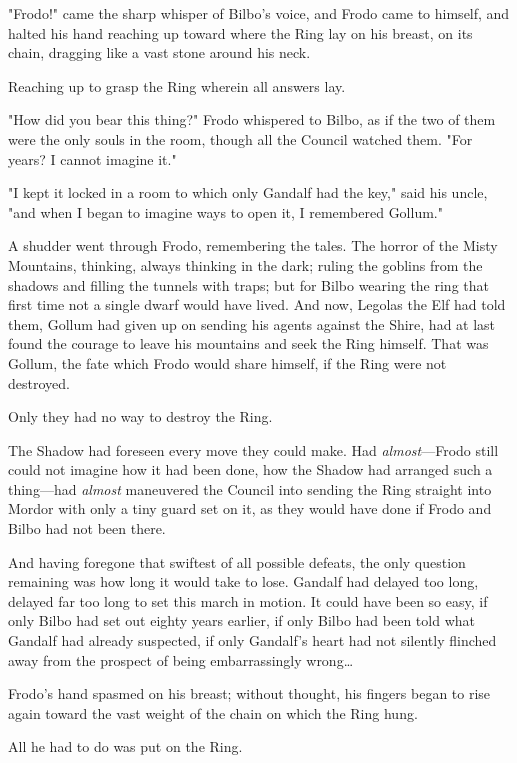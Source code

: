 "Frodo!" came the sharp whisper of Bilbo's voice, and Frodo came to himself, 
and halted his hand reaching up toward where the Ring lay on his breast, on its 
chain, dragging like a vast stone around his neck.

Reaching up to grasp the Ring wherein all answers lay.

"How did you bear this thing?" Frodo whispered to Bilbo, as if the two of them 
were the only souls in the room, though all the Council watched them. "For 
years? I cannot imagine it."

"I kept it locked in a room to which only Gandalf had the key," said his uncle, 
"and when I began to imagine ways to open it, I remembered Gollum."

A shudder went through Frodo, remembering the tales. The horror of the Misty 
Mountains, thinking, always thinking in the dark; ruling the goblins from the 
shadows and filling the tunnels with traps; but for Bilbo wearing the ring that 
first time not a single dwarf would have lived. And now, Legolas the Elf had 
told them, Gollum had given up on sending his agents against the Shire, had at 
last found the courage to leave his mountains and seek the Ring himself. That 
was Gollum, the fate which Frodo would share himself, if the Ring were not 
destroyed.

Only they had no way to destroy the Ring.

The Shadow had foreseen every move they could make. Had \emph{almost}---Frodo 
still could not imagine how it had been done, how the Shadow had arranged such 
a thing---had \emph{almost} maneuvered the Council into sending the Ring 
straight into Mordor with only a tiny guard set on it, as they would have done 
if Frodo and Bilbo had not been there.

And having foregone that swiftest of all possible defeats, the only question 
remaining was how long it would take to lose. Gandalf had delayed too long, 
delayed far too long to set this march in motion. It could have been so easy, 
if only Bilbo had set out eighty years earlier, if only Bilbo had been told 
what Gandalf had already suspected, if only Gandalf's heart had not silently 
flinched away from the prospect of being embarrassingly wrong{\ldots}

Frodo's hand spasmed on his breast; without thought, his fingers began to rise 
again toward the vast weight of the chain on which the Ring hung.

All he had to do was put on the Ring.

